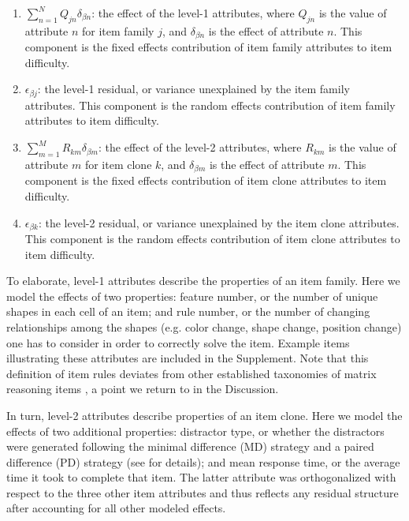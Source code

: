 \documentclass[a4paper,man,natbib]{apa6}
\begin{document}
\begin{enumerate}

\item $\sum_{n=1}^N Q_{jn} \delta_{\beta n}$: the effect of the level-1 attributes, where $Q_{jn}$ is the value of attribute $n$ for item family $j$, and $\delta_{\beta n}$ is the effect of attribute $n$. This component is the fixed effects contribution of item family attributes to item difficulty.

\item $\epsilon_{\beta j}$: the level-1 residual, or variance unexplained by the item family attributes. This component is the random effects contribution of item family attributes to item difficulty.

\item $\sum_{m=1}^M R_{km} \delta_{\beta m}$: the effect of the level-2 attributes, where $R_{km}$ is the value of attribute $m$ for item clone $k$, and $\delta_{\beta m}$ is the effect of attribute $m$. This component is the fixed effects contribution of item clone attributes to item difficulty.

\item $\epsilon_{\beta k}$: the level-2 residual, or variance unexplained by the item clone attributes. This component is the random effects contribution of item clone attributes to item difficulty.

\end{enumerate}

To elaborate, level-1 attributes describe the properties of an item family. Here we model the effects of two properties: feature number, or the number of unique shapes in each cell of an item; and rule number, or the number of changing relationships among the shapes (e.g. color change, shape change, position change) one has to consider in order to correctly solve the item. Example items illustrating these attributes are included in the Supplement.  Note that this definition of item rules deviates from other established taxonomies of matrix reasoning items \citep{carpenter1990one}, a point we return to in the Discussion.

In turn, level-2 attributes describe properties of an item clone. Here we model the effects of two additional properties: distractor type, or whether the distractors were generated following the minimal difference (MD) strategy and a paired difference (PD) strategy (see \cite{chierchia2019matrix} for details); and mean response time, or the average time it took to complete that item. The latter attribute was orthogonalized with respect to the three other item attributes and thus reflects any residual structure after accounting for all other modeled effects. 
\end{document}
